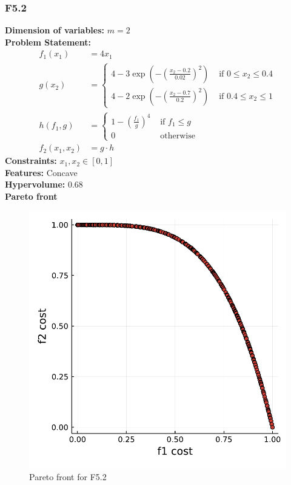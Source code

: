 \documentclass[11pt,oneside,onecolumn,openright]{article}
\begin{document}
   \subsubsection{F5.2~\cite{audet2008multiobjective}}
      \textbf{Dimension of variables: }$m=2$\\
  \noindent\textbf{Problem Statement: }
   \begin{equation}
  \begin{aligned}
  f_1(x_1) &= 4x_1 \\
  g\left(x_{2}\right)&= \begin{cases}4-3 \exp \left(-(\frac{x_{2}-0.2}{0.02})^{2}\right) & \text { if } 0 \leq x_{2} \leq 0.4 \\ 4-2 \exp \left(-(\frac{x_{2}-0.7}{0.2})^{2}\right) & \text { if } 0.4 \leq x_{2} \leq 1\end{cases}\\
  h\left(f_{1}, g\right)&= \begin{cases}1 -\left(\frac{f_{1}}{g}\right)^{4} & \text { if } f_{1} \leq g \\ 0 & \text { otherwise }\end{cases}\\
  f_2(x_{1}, x_{2})&=g\cdot h
  \end{aligned}
  \end{equation}
  \noindent\textbf{Constraints: } $x_{1}, x_{2} \in[0,1]$\\
  \noindent\textbf{Features: } Concave\\
  \noindent\textbf{Hypervolume: } 0.68\\
  \noindent\textbf{Pareto front}
      \begin{figure}[H]
      \centering
      \includegraphics[width=12cm]{fig/ncvx2.pdf}
      \cprotect\caption{Pareto front for F5.2}
      \end{figure}
\end{document}
